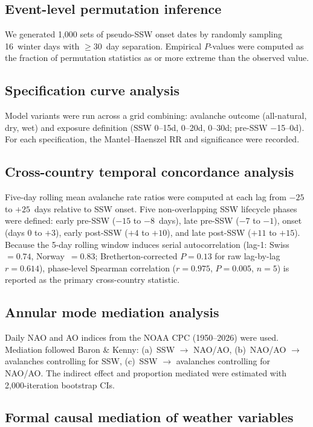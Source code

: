 \documentclass[11pt,letterpaper]{article}
\begin{document}
\subsection{Event-level permutation inference}

We generated 1,000 sets of pseudo-SSW onset dates by randomly sampling 16~winter days with $\geq 30$~day separation. Empirical $P$-values were computed as the fraction of permutation statistics as or more extreme than the observed value.

\subsection{Specification curve analysis}

Model variants were run across a grid combining: avalanche outcome (all-natural, dry, wet) and exposure definition (SSW 0--15d, 0--20d, 0--30d; pre-SSW $-$15--0d). For each specification, the Mantel--Haenszel RR and significance were recorded.

\subsection{Cross-country temporal concordance analysis}

Five-day rolling mean avalanche rate ratios were computed at each lag from $-25$ to $+25$~days relative to SSW onset. Five non-overlapping SSW lifecycle phases were defined: early pre-SSW ($-15$ to $-8$~days), late pre-SSW ($-7$ to $-1$), onset (days $0$ to $+3$), early post-SSW ($+4$ to $+10$), and late post-SSW ($+11$ to $+15$). Because the 5-day rolling window induces serial autocorrelation (lag-1: Swiss~$= 0.74$, Norway~$= 0.83$; Bretherton-corrected $P = 0.13$ for raw lag-by-lag $r = 0.614$), phase-level Spearman correlation ($r = 0.975$, $P = 0.005$, $n = 5$) is reported as the primary cross-country statistic.

\subsection{Annular mode mediation analysis}

Daily NAO and AO indices from the NOAA CPC (1950--2026) were used. Mediation followed Baron \& Kenny: (a)~SSW $\to$ NAO/AO, (b)~NAO/AO $\to$ avalanches controlling for SSW, (c)~SSW $\to$ avalanches controlling for NAO/AO. The indirect effect and proportion mediated were estimated with 2,000-iteration bootstrap CIs.

\subsection{Formal causal mediation of weather variables}
\end{document}
